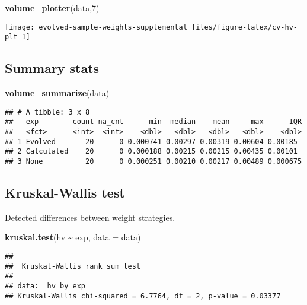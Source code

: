 \documentclass[
]{book}
\newenvironment{Shaded}{\begin{snugshade}}{\end{snugshade}}
\newcommand{\AttributeTok}[1]{\textcolor[rgb]{0.13,0.29,0.53}{#1}}
\newcommand{\DecValTok}[1]{\textcolor[rgb]{0.00,0.00,0.81}{#1}}
\newcommand{\FunctionTok}[1]{\textcolor[rgb]{0.13,0.29,0.53}{\textbf{#1}}}
\newcommand{\NormalTok}[1]{#1}
\newcommand{\SpecialCharTok}[1]{\textcolor[rgb]{0.81,0.36,0.00}{\textbf{#1}}}
\begin{document}
\begin{Shaded}
\begin{Highlighting}[]
\FunctionTok{volume\_plotter}\NormalTok{(data,}\DecValTok{7}\NormalTok{)}
\end{Highlighting}
\end{Shaded}

\texttt{[image: evolved-sample-weights-supplemental\_files/figure-latex/cv-hv-plt-1]}

\hypertarget{summary-stats-6}{%
\subsection{Summary stats}\label{summary-stats-6}}

\begin{Shaded}
\begin{Highlighting}[]
\FunctionTok{volume\_summarize}\NormalTok{(data)}
\end{Highlighting}
\end{Shaded}

\begin{verbatim}
## # A tibble: 3 x 8
##   exp        count na_cnt      min  median    mean     max      IQR
##   <fct>      <int>  <int>    <dbl>   <dbl>   <dbl>   <dbl>    <dbl>
## 1 Evolved       20      0 0.000741 0.00297 0.00319 0.00604 0.00185 
## 2 Calculated    20      0 0.000188 0.00215 0.00215 0.00435 0.00101 
## 3 None          20      0 0.000251 0.00210 0.00217 0.00489 0.000675
\end{verbatim}

\hypertarget{kruskal-wallis-test-6}{%
\subsection{Kruskal-Wallis test}\label{kruskal-wallis-test-6}}

Detected differences between weight strategies.

\begin{Shaded}
\begin{Highlighting}[]
\FunctionTok{kruskal.test}\NormalTok{(hv }\SpecialCharTok{\textasciitilde{}}\NormalTok{ exp, }\AttributeTok{data =}\NormalTok{ data)}
\end{Highlighting}
\end{Shaded}

\begin{verbatim}
## 
##  Kruskal-Wallis rank sum test
## 
## data:  hv by exp
## Kruskal-Wallis chi-squared = 6.7764, df = 2, p-value = 0.03377
\end{verbatim}
\end{document}
